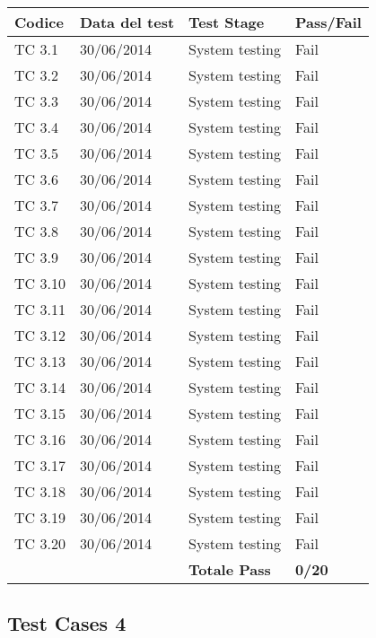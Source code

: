 \begin{tabular}{|p{3cm}|p{3cm}|p{3cm}|p{3cm}|}
	\hline
	\rowcolor{Gray}
	\textbf{Codice} & \textbf{Data del test} & \textbf{Test Stage} & \textbf{Pass/Fail}\tabularnewline
	\hline
	TC 3.1			& 30/06/2014 			& System testing		& Fail \tabularnewline
	\hline
	TC 3.2			& 30/06/2014 			& System testing		& Fail \tabularnewline
	\hline
	TC 3.3			& 30/06/2014 			& System testing		& Fail \tabularnewline
	\hline
	TC 3.4			& 30/06/2014 			& System testing		& Fail \tabularnewline
	\hline
	TC 3.5			& 30/06/2014 			& System testing		& Fail \tabularnewline
	\hline
	TC 3.6			& 30/06/2014 			& System testing		& Fail \tabularnewline
	\hline
	TC 3.7			& 30/06/2014 			& System testing		& Fail \tabularnewline
	\hline
	TC 3.8			& 30/06/2014 			& System testing		& Fail \tabularnewline
	\hline
	TC 3.9			& 30/06/2014 			& System testing		& Fail \tabularnewline
	\hline
	TC 3.10			& 30/06/2014 			& System testing		& Fail \tabularnewline
	\hline
	TC 3.11			& 30/06/2014 			& System testing		& Fail \tabularnewline
	\hline
	TC 3.12			& 30/06/2014 			& System testing		& Fail \tabularnewline
	\hline
	TC 3.13			& 30/06/2014 			& System testing		& Fail \tabularnewline
	\hline
	TC 3.14			& 30/06/2014 			& System testing		& Fail \tabularnewline
	\hline
	TC 3.15			& 30/06/2014 			& System testing		& Fail \tabularnewline
	\hline
	TC 3.16			& 30/06/2014 			& System testing		& Fail \tabularnewline
	\hline
	TC 3.17			& 30/06/2014 			& System testing		& Fail \tabularnewline
	\hline
	TC 3.18			& 30/06/2014 			& System testing		& Fail \tabularnewline
	\hline
	TC 3.19			& 30/06/2014 			& System testing		& Fail \tabularnewline
	\hline
	TC 3.20			& 30/06/2014 			& System testing		& Fail \tabularnewline
	\hline
					& 						& \textbf{Totale Pass}	& \textbf{0/20} \tabularnewline
	\hline
\end{tabular}

\subsection{Test Cases 4}

